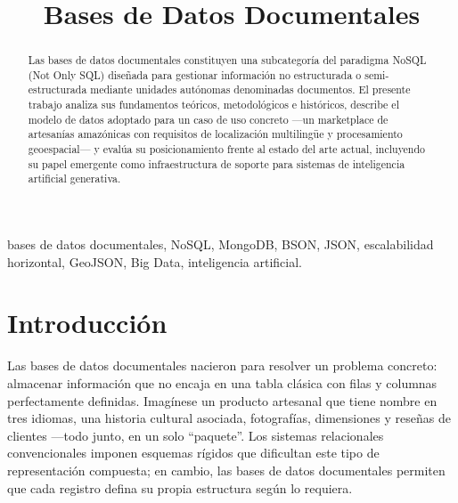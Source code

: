 \documentclass[conference]{IEEEtran}
\begin{document}
\title{Bases de Datos Documentales}

\author{
}

\maketitle

\begin{abstract}
Las bases de datos documentales constituyen una subcategoría del paradigma NoSQL (Not Only SQL) diseñada para gestionar información no estructurada o semi-estructurada mediante unidades autónomas denominadas documentos. El presente trabajo analiza sus fundamentos teóricos, metodológicos e históricos, describe el modelo de datos adoptado para un caso de uso concreto —un marketplace de artesanías amazónicas con requisitos de localización multilingüe y procesamiento geoespacial— y evalúa su posicionamiento frente al estado del arte actual, incluyendo su papel emergente como infraestructura de soporte para sistemas de inteligencia artificial generativa.
\end{abstract}

\begin{IEEEkeywords}
bases de datos documentales, NoSQL, MongoDB, BSON, JSON, escalabilidad horizontal, GeoJSON, Big Data, inteligencia artificial.
\end{IEEEkeywords}

\section{Introducción}

Las bases de datos documentales nacieron para resolver un problema concreto: almacenar información que no encaja en una tabla clásica con filas y columnas perfectamente definidas. Imagínese un producto artesanal que tiene nombre en tres idiomas, una historia cultural asociada, fotografías, dimensiones y reseñas de clientes —todo junto, en un solo ``paquete''. Los sistemas relacionales convencionales imponen esquemas rígidos que dificultan este tipo de representación compuesta; en cambio, las bases de datos documentales permiten que cada registro defina su propia estructura según lo requiera.
\end{document}
